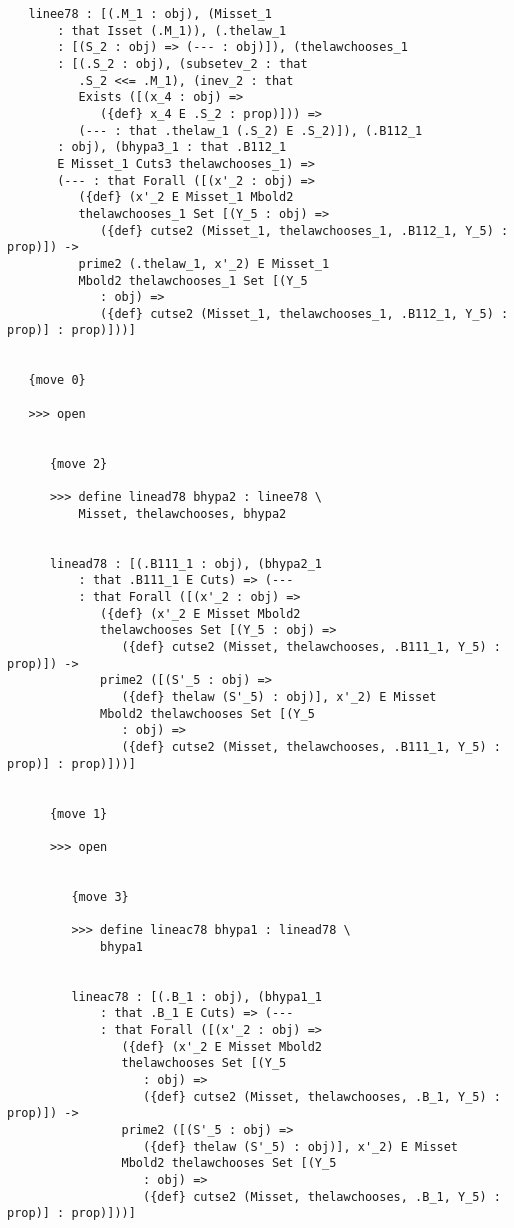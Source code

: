 \documentclass[12pt]{article}
\begin{document}
\begin{verbatim}
   linee78 : [(.M_1 : obj), (Misset_1 
       : that Isset (.M_1)), (.thelaw_1 
       : [(S_2 : obj) => (--- : obj)]), (thelawchooses_1 
       : [(.S_2 : obj), (subsetev_2 : that 
          .S_2 <<= .M_1), (inev_2 : that 
          Exists ([(x_4 : obj) => 
             ({def} x_4 E .S_2 : prop)])) => 
          (--- : that .thelaw_1 (.S_2) E .S_2)]), (.B112_1 
       : obj), (bhypa3_1 : that .B112_1 
       E Misset_1 Cuts3 thelawchooses_1) => 
       (--- : that Forall ([(x'_2 : obj) => 
          ({def} (x'_2 E Misset_1 Mbold2 
          thelawchooses_1 Set [(Y_5 : obj) => 
             ({def} cutse2 (Misset_1, thelawchooses_1, .B112_1, Y_5) : prop)]) -> 
          prime2 (.thelaw_1, x'_2) E Misset_1 
          Mbold2 thelawchooses_1 Set [(Y_5 
             : obj) => 
             ({def} cutse2 (Misset_1, thelawchooses_1, .B112_1, Y_5) : prop)] : prop)]))]


   {move 0}

   >>> open


      {move 2}

      >>> define linead78 bhypa2 : linee78 \
          Misset, thelawchooses, bhypa2


      linead78 : [(.B111_1 : obj), (bhypa2_1 
          : that .B111_1 E Cuts) => (--- 
          : that Forall ([(x'_2 : obj) => 
             ({def} (x'_2 E Misset Mbold2 
             thelawchooses Set [(Y_5 : obj) => 
                ({def} cutse2 (Misset, thelawchooses, .B111_1, Y_5) : prop)]) -> 
             prime2 ([(S'_5 : obj) => 
                ({def} thelaw (S'_5) : obj)], x'_2) E Misset 
             Mbold2 thelawchooses Set [(Y_5 
                : obj) => 
                ({def} cutse2 (Misset, thelawchooses, .B111_1, Y_5) : prop)] : prop)]))]


      {move 1}

      >>> open


         {move 3}

         >>> define lineac78 bhypa1 : linead78 \
             bhypa1


         lineac78 : [(.B_1 : obj), (bhypa1_1 
             : that .B_1 E Cuts) => (--- 
             : that Forall ([(x'_2 : obj) => 
                ({def} (x'_2 E Misset Mbold2 
                thelawchooses Set [(Y_5 
                   : obj) => 
                   ({def} cutse2 (Misset, thelawchooses, .B_1, Y_5) : prop)]) -> 
                prime2 ([(S'_5 : obj) => 
                   ({def} thelaw (S'_5) : obj)], x'_2) E Misset 
                Mbold2 thelawchooses Set [(Y_5 
                   : obj) => 
                   ({def} cutse2 (Misset, thelawchooses, .B_1, Y_5) : prop)] : prop)]))]



\end{verbatim}
\end{document}
